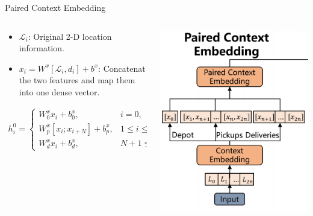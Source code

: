 \documentclass{beamer}
\begin{document}
\begin{frame}{Paired Context Embedding}
	\begin{columns}
		\begin{column}{0.6\textwidth}
			\footnotesize
			\begin{itemize}
				\item $\mathcal{L}_i$: Original 2-D location information.\\
				\item  $x_i=W^{x}[\mathcal{L}_{i},d_{i}]+b^{x}$: Concatenat the two features and map them into one dense vector.\\
			\end{itemize}
			\begin{align}
				h_i^0=\begin{cases}W_0^xx_i+b_0^x,&i=0,\\W_p^x[x_i;x_{i+N}]+b_p^x,&1\le i\le N,\\W_d^xx_i+b_d^x,&N+1\le i\le2N,\end{cases}
			\end{align}
		\end{column}
		\begin{column}{0.4\textwidth}
			\centering
			\includegraphics[width=\textwidth]{PCE.png} %
		\end{column}
	\end{columns}
\end{frame}
\end{document}
